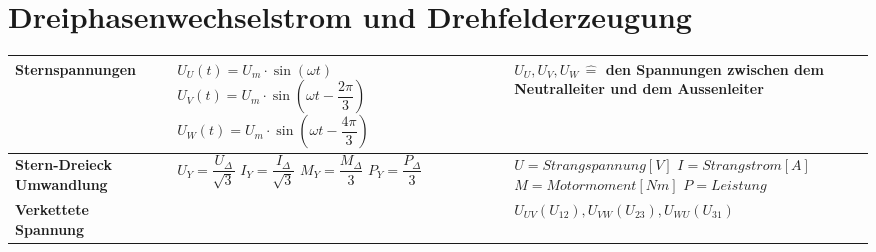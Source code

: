 \section{Dreiphasenwechselstrom und Drehfelderzeugung}
    \renewcommand{\arraystretch}{1.5}
    \begin{tabular}[b]{| C{4cm} | P{5cm} | P{9cm} |}
    	\hline
        \textbf{Sternspannungen} &
        $U_U(t) = U_m\cdot\sin\left(\omega t\right)$ \newline \newline
        $U_V(t) = U_m\cdot\sin\left(\omega t - \dfrac{2\pi}{3}\right)$ \newline \newline
        $U_W(t) = U_m\cdot\sin\left(\omega t - \dfrac{4\pi}{3}\right)$ &
        $U_U, U_V, U_W \,\widehat{=}$ den Spannungen zwischen dem Neutralleiter und dem Aussenleiter
        \\ \hline
        
        \textbf{Stern-Dreieck Umwandlung}&
        \vspace{0.025cm}$ U_Y= \dfrac{U_\Delta}{\sqrt{3}} $\qquad
        $ I_Y= \dfrac{I_\Delta}{\sqrt{3}} $ \newline
        \vspace{0.025cm}$ M_Y= \dfrac{M_\Delta}{3} $ \qquad
        $ P_Y = \dfrac{P_\Delta}{3}$&
        $U = Strangspannung [V] $\newline
        $I = Strangstrom [A] $\newline
        $M = Motormoment [Nm]$ \newline 
        $P = Leistung$
        \\ \hline
                
        \textbf{Verkettete Spannung} & 	&
        $U_{UV}(U_{12}), U_{VW}(U_{23}), U_{WU}(U_{31})$
        \\ \hline
    \end{tabular}
    \\[0.2cm]
